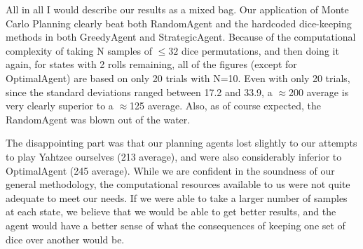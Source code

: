\documentclass{article}
\begin{document}
\vspace{1em}

All in all
I would describe our results as a mixed bag. Our application of Monte
Carlo Planning clearly beat both RandomAgent and the hardcoded dice-keeping
methods in both GreedyAgent and StrategicAgent. Because of the computational
complexity of taking N samples of $\le 32$ dice permutations, and then doing it
again, for states with 2 rolls remaining, all of the figures (except for
OptimalAgent) are based on only 20 trials with N=10. Even with only 20 trials,
since the standard deviations ranged between 17.2 and 33.9, a 
$\approx$200 average is very clearly superior to a $\approx$125 average. Also,
as of course expected, the RandomAgent was blown out of the water.

\vspace{1em}

The disappointing part was that our planning agents lost slightly to our
attempts to
play Yahtzee ourselves (213 average), and were also considerably inferior to
OptimalAgent (245 average). While we are confident in the soundness of our
general methodology, the computational resources available to us were not quite
adequate to meet our needs. If we were able to take a larger number of samples
at each state, we believe that we would be able to get better results, and the
agent would have a better sense of what the consequences of keeping one set of
dice over another would be. 
\end{document}
